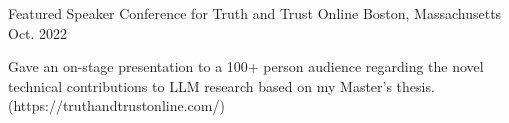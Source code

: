 

\begin{cventries}

\cventry
{Featured Speaker} %
{Conference for Truth and Trust Online} %
{Boston, Massachusetts} %
{Oct. 2022} %
{
  \begin{cvitems} %
    \item {Gave an on-stage presentation to a 100+ person audience regarding the novel technical contributions to LLM research based on my Master's thesis. (https://truthandtrustonline.com/)}
  \end{cvitems}
}

% 
\end{cventries}
